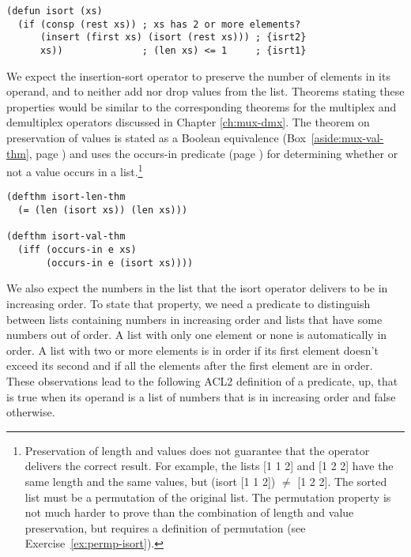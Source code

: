 \label{defun:isort}
\begin{code}
\begin{verbatim}
(defun isort (xs)
  (if (consp (rest xs)) ; xs has 2 or more elements?
      (insert (first xs) (isort (rest xs))) ; {isrt2}
      xs))              ; (len xs) <= 1     ; {isrt1}
\end{verbatim}
\end{code}

We expect the insertion-sort operator to preserve
the number of elements in its operand, and to
neither add nor drop values from the list.
Theorems stating these properties would be
similar to the corresponding theorems for
the multiplex and demultiplex operators discussed
in Chapter \ref{ch:mux-dmx}.
The theorem on preservation of values is
stated as a
Boolean
equivalence
(Box~\ref{aside:mux-val-thm}, page \pageref{aside:mux-val-thm})
and uses the \textsf{occurs-in }predicate
(page \pageref{def:occurs-in}) for determining
whether or not a value occurs in a list.\footnote{Preservation
of length and values does not guarantee
that the operator delivers the correct result.
For example, the lists \textsf{[1 1 2]} and \textsf{[1 2 2]} have the
same length and the same values,
but \textsf{(isort [1 1 2]) $\neq$ [1 2 2]}.
The sorted list must be a permutation of the original list.
The permutation property is not much harder
to prove than the combination of length and value preservation,
but requires a definition of permutation
(see Exercise~\ref{ex:permp-isort}).}

\label{defthm:isort-len}
\label{defthm:isort-val}
\begin{code}
\begin{verbatim}
(defthm isort-len-thm
  (= (len (isort xs)) (len xs)))

(defthm isort-val-thm
  (iff (occurs-in e xs)
       (occurs-in e (isort xs))))
\end{verbatim}
\end{code}

We also expect the numbers in the list
that the \textsf{isort} operator
delivers to be in increasing order.
To state that property, we need a predicate
to distinguish between lists containing numbers in increasing order
and lists that have some numbers out of order.
A list with only one element or none is automatically in order.
A list with two or more elements is in order
if its first element doesn't exceed its second and if
all the elements after the first element are in order.
These observations lead to the following
ACL2 definition of a predicate, \textsf{up},
that is true when its operand is a list
of numbers that is in increasing order and false otherwise.

